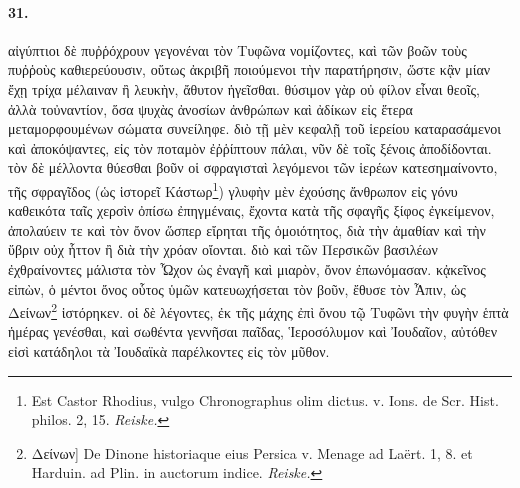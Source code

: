 \documentclass[a4paper, 11pt, oneside, polutonikogreek, german, landscape]{article}
\begin{document}
\paragraph{31.}
αἰγύπτιοι δὲ πυῤῥόχρουν γεγονέναι τὸν Τυφῶνα νομίζοντες, καὶ τῶν βοῶν τοὺς πυῤῥοὺς καθιερεύουσιν, οὕτως ἀκριβῆ ποιούμενοι τὴν παρατήρησιν, ὥστε κᾂν μίαν ἔχῃ τρίχα μέλαιναν ἢ λευκὴν, ἄθυτον ἡγεῖσθαι. θύσιμον γὰρ οὐ φίλον εἶναι θεοῖς, ἀλλὰ τοὐναντίον, ὅσα ψυχὰς ἀνοσίων ἀνθρώπων καὶ ἀδίκων εἰς ἕτερα μεταμορφουμένων σώματα συνείληφε. διὸ τῇ μὲν κεφαλῇ τοῦ ἱερείου καταρασάμενοι καὶ ἀποκόψαντες, εἰς τὸν ποταμὸν ἐῤῥίπτουν πάλαι, νῦν δὲ τοῖς ξένοις ἀποδίδονται. τὸν δὲ μέλλοντα θύεσθαι βοῦν οἱ σφραγισταὶ λεγόμενοι τῶν ἱερέων κατεσημαίνοντο, τῆς σφραγῖδος (ὡς ἱστορεῖ Κάστωρ\footnote{Est Castor Rhodius, vulgo Chronographus olim dictus. v. Ions. de Scr. Hist. philos. 2, 15. \emph{Reiske.}}) γλυφὴν μὲν ἐχούσης ἄνθρωπον εἰς γόνυ καθεικότα ταῖς χερσὶν ὀπίσω ἐπηγμέναις, ἔχοντα κατὰ τῆς σφαγῆς ξίφος ἐγκείμενον, ἀπολαύειν τε καὶ τὸν ὄνον ὥσπερ εἴρηται τῆς ὁμοιότητος, διὰ τὴν ἀμαθίαν καὶ τὴν ὕβριν οὐχ ἧττον ἢ διὰ τὴν χρόαν οἴονται. διὸ καὶ τῶν Περσικῶν βασιλέων ἐχθραίνοντες μάλιστα τὸν Ὦχον ὡς ἐναγῆ καὶ μιαρὸν, ὄνον ἐπωνόμασαν. κᾀκεῖνος εἰπὼν, ὁ μέντοι ὄνος οὗτος ὑμῶν κατευωχήσεται τὸν βοῦν, ἔθυσε τὸν Ἆπιν, ὡς Δείνων\footnote{Δείνων] De Dinone historiaque eius Persica v. Menage ad Laërt. 1, 8. et Harduin. ad Plin. in auctorum indice. \emph{Reiske.}} ἱστόρηκεν. οἱ δὲ λέγοντες, ἐκ τῆς μάχης ἐπὶ ὄνου τῷ Τυφῶνι τὴν φυγὴν ἑπτὰ ἡμέρας γενέσθαι, καὶ σωθέντα γεννῆσαι παῖδας, Ἱεροσόλυμον καὶ Ἰουδαῖον, αὐτόθεν εἰσὶ κατάδηλοι τὰ Ἰουδαϊκὰ παρέλκοντες εἰς τὸν μῦθον.
\end{document}
